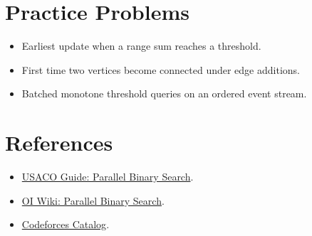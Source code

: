 \section*{Practice Problems}

\begin{itemize}
  \item Earliest update when a range sum reaches a threshold.
  \item First time two vertices become connected under edge additions.
  \item Batched monotone threshold queries on an ordered event stream.
\end{itemize}

\section*{References}

\begin{itemize}
  \item \href{https://usaco.guide/plat/parallel-binsearch}{USACO Guide: Parallel Binary Search}.
  \item \href{https://oiwiki.com/misc/parallel-binsearch/}{OI Wiki: Parallel Binary Search}.
  \item \href{https://codeforces.com/catalog}{Codeforces Catalog}.
\end{itemize}
